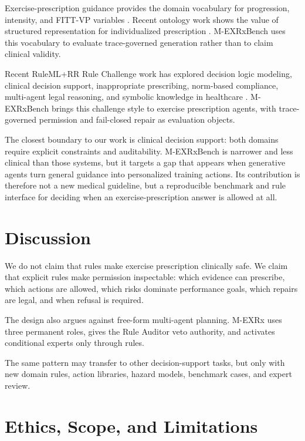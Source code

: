\documentclass{ceurart}
\begin{document}
Exercise-prescription guidance provides the domain vocabulary for progression, intensity, and FITT-VP variables \cite{garber2011exercise,acsm2021guidelines,who2020physicalactivity}. Recent ontology work shows the value of structured representation for individualized prescription \cite{liu2024exmo}. M-EXRxBench uses this vocabulary to evaluate trace-governed generation rather than to claim clinical validity.

Recent RuleML+RR Rule Challenge work has explored decision logic modeling, clinical decision support, inappropriate prescribing, norm-based compliance, multi-agent legal reasoning, and symbolic knowledge in healthcare \cite{goossens2023gpt3decision,kober2023fhir,redeker2023inappropriateprescribing,mitsikas2024normcompliance,sowerby2025bayesianCDSS,fillies2025moderation,sirocchi2024healthcareSymbolicML}. M-EXRxBench brings this challenge style to exercise prescription agents, with trace-governed permission and fail-closed repair as evaluation objects.

The closest boundary to our work is clinical decision support: both domains require explicit constraints and auditability. M-EXRxBench is narrower and less clinical than those systems, but it targets a gap that appears when generative agents turn general guidance into personalized training actions. Its contribution is therefore not a new medical guideline, but a reproducible benchmark and rule interface for deciding when an exercise-prescription answer is allowed at all.

\section{Discussion}

We do not claim that rules make exercise prescription clinically safe. We claim that explicit rules make permission inspectable: which evidence can prescribe, which actions are allowed, which risks dominate performance goals, which repairs are legal, and when refusal is required.

The design also argues against free-form multi-agent planning. M-EXRx uses three permanent roles, gives the Rule Auditor veto authority, and activates conditional experts only through rules.

The same pattern may transfer to other decision-support tasks, but only with new domain rules, action libraries, hazard models, benchmark cases, and expert review.

\section{Ethics, Scope, and Limitations}
\end{document}
